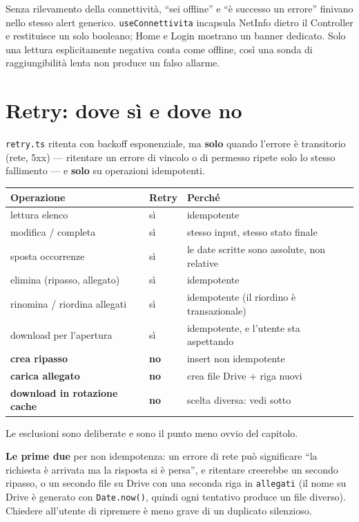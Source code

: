\documentclass[11pt,a4paper]{report}
\begin{document}
Senza rilevamento della connettivit\`a, ``sei offline'' e ``\`e successo un
errore'' finivano nello stesso alert generico. \texttt{useConnettivita}
incapsula NetInfo dietro il Controller e restituisce un solo booleano; Home e
Login mostrano un banner dedicato. Solo una lettura esplicitamente negativa
conta come offline, cos\`i una sonda di raggiungibilit\`a lenta non produce un
falso allarme.

\section{Retry: dove s\`i e dove no}
\label{sec:retry}

\texttt{retry.ts} ritenta con backoff esponenziale, ma \textbf{solo} quando
l'errore \`e transitorio (rete, 5xx) — ritentare un errore di vincolo o di
permesso ripete solo lo stesso fallimento — e \textbf{solo} su operazioni
idempotenti.

\begin{center}
\small
\begin{tabular}{@{}p{5.0cm}p{1.3cm}p{8.2cm}@{}}
\toprule
\textbf{Operazione} & \textbf{Retry} & \textbf{Perch\'e} \\
\midrule
lettura elenco & s\`i & idempotente \\
modifica / completa & s\`i & stesso input, stesso stato finale \\
sposta occorrenze & s\`i & le date scritte sono assolute, non relative \\
elimina (ripasso, allegato) & s\`i & idempotente \\
rinomina / riordina allegati & s\`i & idempotente (il riordino \`e transazionale) \\
download per l'apertura & s\`i & idempotente, e l'utente sta aspettando \\
\midrule
\textbf{crea ripasso} & \textbf{no} & insert non idempotente \\
\textbf{carica allegato} & \textbf{no} & crea file Drive + riga nuovi \\
\textbf{download in rotazione cache} & \textbf{no} & scelta diversa: vedi sotto \\
\bottomrule
\end{tabular}
\end{center}

Le esclusioni sono deliberate e sono il punto meno ovvio del capitolo.

\textbf{Le prime due} per non idempotenza: un errore di rete pu\`o significare
``la richiesta \`e arrivata ma la risposta si \`e persa'', e ritentare
creerebbe un secondo ripasso, o un secondo file su Drive con una seconda riga
in \texttt{allegati} (il nome su Drive \`e generato con \texttt{Date.now()},
quindi ogni tentativo produce un file diverso). Chiedere all'utente di
ripremere \`e meno grave di un duplicato silenzioso.
\end{document}
